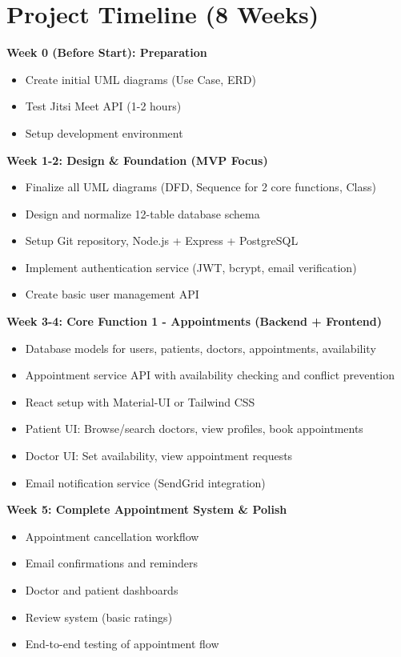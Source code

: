 \documentclass[11pt,a4paper]{article}
\begin{document}
\section{Project Timeline (8 Weeks)}

\textbf{Week 0 (Before Start): Preparation}
\begin{itemize}[leftmargin=*, itemsep=0.05em]
    \item Create initial UML diagrams (Use Case, ERD)
    \item Test Jitsi Meet API (1-2 hours)
    \item Setup development environment
\end{itemize}

\textbf{Week 1-2: Design \& Foundation (MVP Focus)}
\begin{itemize}[leftmargin=*, itemsep=0.05em]
    \item Finalize all UML diagrams (DFD, Sequence for 2 core functions, Class)
    \item Design and normalize 12-table database schema
    \item Setup Git repository, Node.js + Express + PostgreSQL
    \item Implement authentication service (JWT, bcrypt, email verification)
    \item Create basic user management API
\end{itemize}

\textbf{Week 3-4: Core Function 1 - Appointments (Backend + Frontend)}
\begin{itemize}[leftmargin=*, itemsep=0.05em]
    \item Database models for users, patients, doctors, appointments, availability
    \item Appointment service API with availability checking and conflict prevention
    \item React setup with Material-UI or Tailwind CSS
    \item Patient UI: Browse/search doctors, view profiles, book appointments
    \item Doctor UI: Set availability, view appointment requests
    \item Email notification service (SendGrid integration)
\end{itemize}

\textbf{Week 5: Complete Appointment System \& Polish}
\begin{itemize}[leftmargin=*, itemsep=0.05em]
    \item Appointment cancellation workflow
    \item Email confirmations and reminders
    \item Doctor and patient dashboards
    \item Review system (basic ratings)
    \item End-to-end testing of appointment flow
\end{itemize}
\end{document}
